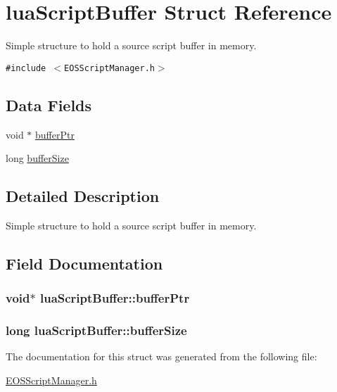 \hypertarget{structluaScriptBuffer}{
\section{luaScriptBuffer Struct Reference}
\label{structluaScriptBuffer}
}
Simple structure to hold a source script buffer in memory.  


{\tt \#include $<$EOSScriptManager.h$>$}

\subsection*{Data Fields}
\begin{CompactItemize}
\item 
void $\ast$ \hyperlink{structluaScriptBuffer_a7061672bf0258e01709a72205d96453}{bufferPtr}
\item 
long \hyperlink{structluaScriptBuffer_8a890de049fa15c034921afd79e72023}{bufferSize}
\end{CompactItemize}


\subsection{Detailed Description}
Simple structure to hold a source script buffer in memory. 

\subsection{Field Documentation}
\hypertarget{structluaScriptBuffer_a7061672bf0258e01709a72205d96453}{
\subsubsection[{bufferPtr}]{\setlength{\rightskip}{0pt plus 5cm}void$\ast$ {\bf luaScriptBuffer::bufferPtr}}}
\label{structluaScriptBuffer_a7061672bf0258e01709a72205d96453}


\hypertarget{structluaScriptBuffer_8a890de049fa15c034921afd79e72023}{
\subsubsection[{bufferSize}]{\setlength{\rightskip}{0pt plus 5cm}long {\bf luaScriptBuffer::bufferSize}}}
\label{structluaScriptBuffer_8a890de049fa15c034921afd79e72023}




The documentation for this struct was generated from the following file:\begin{CompactItemize}
\item 
\hyperlink{EOSScriptManager_8h}{EOSScriptManager.h}\end{CompactItemize}
